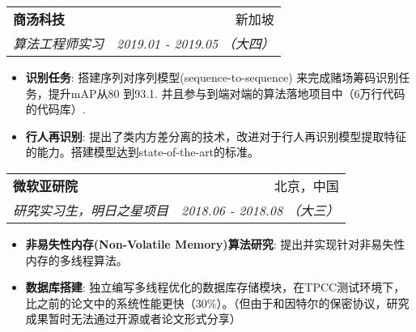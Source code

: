 \documentclass[UTF8,letterpaper,11pt]{ctexart}
\makeatletter
\newcommand{\resumeItem}[2]{
  \item\small{
    \textbf{#1}{: #2 \vspace{-3pt}}
  }
}
\newcommand{\resumeSubheading}[4]{
  \vspace{-1pt}\item
    \begin{tabular*}{0.97\textwidth}[t]{l@{\extracolsep{\fill}}r}
      \textbf{#1} & #2 \\
      \textit{\small#3} & \textit{\small #4} \\
    \end{tabular*}\vspace{-5pt}
}
\newcommand{\resumeItemListStart}{\begin{itemize}}
\newcommand{\resumeItemListEnd}{\end{itemize}\vspace{-5pt}}
\makeatother
\begin{document}
    \resumeSubheading
      {商汤科技}{新加坡}
      {算法工程师实习}{2019.01 - 2019.05 （大四）}
      \resumeItemListStart
      \resumeItem { 识别任务} {
      搭建序列对序列模型(sequence-to-sequence) 来完成赌场筹码识别任务，提升mAP从80 到93.1. 并且参与到端对端的算法落地项目中（6万行代码的代码库）.}
      \resumeItem { 行人再识别} {
      提出了类内方差分离的技术，改进对于行人再识别模型提取特征的能力。搭建模型达到state-of-the-art的标准。}
      \resumeItemListEnd
    \resumeSubheading
      {微软亚研院}{北京，中国}
      {研究实习生，明日之星项目}{2018.06 - 2018.08 （大三）}
      \resumeItemListStart
      \resumeItem
      { 非易失性内存(Non-Volatile Memory)算法研究} {
      提出并实现针对非易失性内存的多线程算法。}
      \resumeItem
      { 数据库搭建} {
          独立编写多线程优化的数据库存储模块，在TPCC测试环境下，比之前的论文中的系统性能更快（30\%）。（但由于和因特尔的保密协议，研究成果暂时无法通过开源或者论文形式分享） 
      }
      \resumeItemListEnd


\end{document}

